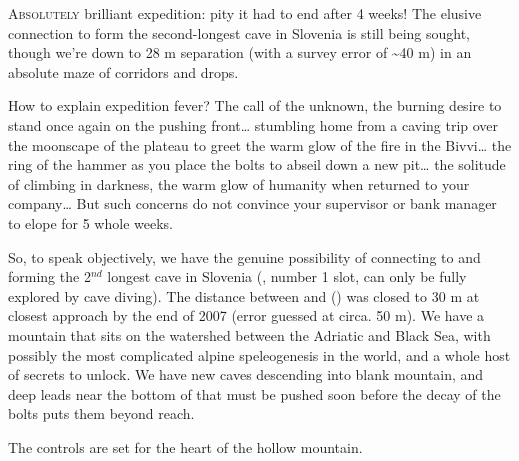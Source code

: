 \thispagestyle{endchapter}

\begin{tcolorbox}

\vspace{80pt}
	\lettrine{A}{bsolutely} brilliant expedition: pity it had to end after 4 weeks! The elusive connection to form the second-longest cave in Slovenia is still being sought, though we're down to 28 m separation (with a survey error of \textasciitilde 40 m) in an absolute maze of corridors and drops.
 
    How to explain expedition fever? The call of the unknown, the burning desire to stand once again on the pushing front\ldots{} stumbling home from a caving trip over the moonscape of the plateau to greet the warm glow of the fire in the Bivvi\ldots{} the ring of the hammer as you place the bolts to abseil down a new pit\ldots{} the solitude of climbing in darkness, the warm glow of humanity when returned to your company\ldots{} But such concerns do not convince your supervisor or bank manager to elope for 5 whole weeks.

    So, to speak objectively, we have the genuine possibility of connecting  to  and forming the 2\(^{nd}\) longest cave in Slovenia (, number 1 slot, can only be fully explored by cave diving). The distance between  and  () was closed to 30 m at closest approach by the end of 2007 (error guessed at circa. 50 m). We have a mountain that sits on the watershed between the Adriatic and Black Sea, with possibly the most complicated alpine speleogenesis in the world, and a whole host of secrets to unlock. We have new caves descending into blank mountain, and deep leads near the bottom of  that must be pushed soon before the decay of the bolts puts them beyond reach.

    The controls are set for the heart of the hollow mountain.



\end{tcolorbox} 
